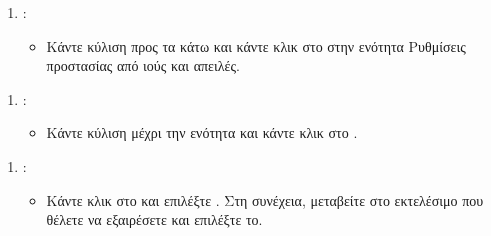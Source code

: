\documentclass[letterpaper,10pt,greek]{sphinxmanual}
\begin{document}
\begin{figure}[htbp]
\centering

\noindent{}
\end{figure}
\begin{enumerate}
%
\setcounter{enumi}{2}
\item {} 
\sphinxAtStartPar
{}:
\begin{itemize}
\item {} 
\sphinxAtStartPar
Κάντε κύλιση προς τα κάτω και κάντε κλικ στο  στην ενότητα Ρυθμίσεις προστασίας από ιούς και απειλές.

\end{itemize}

\end{enumerate}

\begin{figure}[htbp]
\centering

\noindent{}
\end{figure}
\begin{enumerate}
%
\setcounter{enumi}{3}
\item {} 
\sphinxAtStartPar
{}:
\begin{itemize}
\item {} 
\sphinxAtStartPar
Κάντε κύλιση μέχρι την ενότητα  και κάντε κλικ στο .

\end{itemize}

\end{enumerate}

\begin{figure}[htbp]
\centering

\noindent{}
\end{figure}
\begin{enumerate}
%
\setcounter{enumi}{4}
\item {} 
\sphinxAtStartPar
{}:
\begin{itemize}
\item {} 
\sphinxAtStartPar
Κάντε κλικ στο  και επιλέξτε . Στη συνέχεια, μεταβείτε στο εκτελέσιμο που θέλετε να εξαιρέσετε και επιλέξτε το.

\end{itemize}

\end{enumerate}
\end{document}

